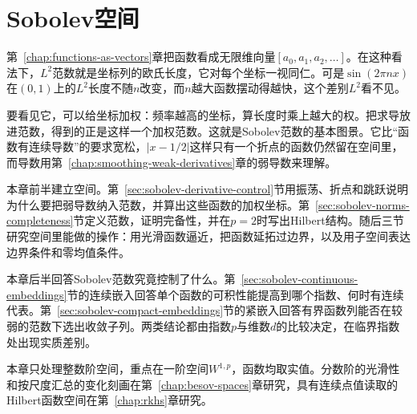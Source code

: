 \chapter{Sobolev空间}
\label{chap:sobolev-spaces}
\label{chap:weak-derivatives-sobolev}

第~\ref{chap:functions-as-vectors}章把函数看成无限维向量$[a_0,a_1,a_2,\ldots]$。在这种看法下，$L^2$范数就是坐标列的欧氏长度，它对每个坐标一视同仁。可是$\sin(2\pi nx)$在$(0,1)$上的$L^2$长度不随$n$改变，而$n$越大函数摆动得越快，这个差别$L^2$看不见。

要看见它，可以给坐标加权：频率越高的坐标，算长度时乘上越大的权。把求导放进范数，得到的正是这样一个加权范数。这就是Sobolev范数的基本图景。它比“函数有连续导数”的要求宽松，$|x-1/2|$这样只有一个折点的函数仍然留在空间里，而导数用第~\ref{chap:smoothing-weak-derivatives}章的弱导数来理解。

本章前半建立空间。第~\ref{sec:sobolev-derivative-control}节用振荡、折点和跳跃说明为什么要把弱导数纳入范数，并算出这些函数的加权坐标。第~\ref{sec:sobolev-norms-completeness}节定义范数，证明完备性，并在$p=2$时写出Hilbert结构。随后三节研究空间里能做的操作：用光滑函数逼近，把函数延拓过边界，以及用子空间表达边界条件和零均值条件。

本章后半回答Sobolev范数究竟控制了什么。第~\ref{sec:sobolev-continuous-embeddings}节的连续嵌入回答单个函数的可积性能提高到哪个指数、何时有连续代表。第~\ref{sec:sobolev-compact-embeddings}节的紧嵌入回答有界函数列能否在较弱的范数下选出收敛子列。两类结论都由指数$p$与维数$d$的比较决定，在临界指数处出现实质差别。

本章只处理整数阶空间，重点在一阶空间$W^{1,p}$，函数均取实值。分数阶的光滑性和按尺度汇总的变化刻画在第~\ref{chap:besov-spaces}章研究，具有连续点值读取的Hilbert函数空间在第~\ref{chap:rkhs}章研究。

















